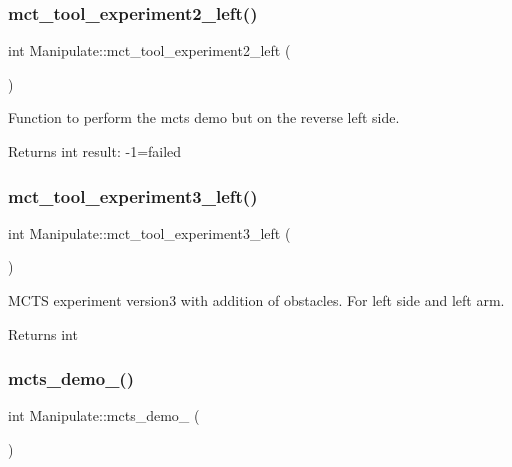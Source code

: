 \subsubsection{\texorpdfstring{mct\+\_\+tool\+\_\+experiment2\+\_\+left()}{mct\_tool\_experiment2\_left()}}
{\footnotesize\ttfamily int Manipulate\+::mct\+\_\+tool\+\_\+experiment2\+\_\+left (\begin{DoxyParamCaption}{ }\end{DoxyParamCaption})\hspace{0.3cm}{\ttfamily [private]}}



Function to perform the mcts demo but on the reverse left side. 

\begin{DoxyReturn}{Returns}
int result\+: -\/1=failed 
\end{DoxyReturn}
\mbox{\label{structManipulate_a7b8394f3cd61252c79d9c1956e7aab2e}} 
\subsubsection{\texorpdfstring{mct\+\_\+tool\+\_\+experiment3\+\_\+left()}{mct\_tool\_experiment3\_left()}}
{\footnotesize\ttfamily int Manipulate\+::mct\+\_\+tool\+\_\+experiment3\+\_\+left (\begin{DoxyParamCaption}{ }\end{DoxyParamCaption})\hspace{0.3cm}{\ttfamily [private]}}



M\+C\+TS experiment version3 with addition of obstacles. For left side and left arm. 

\begin{DoxyReturn}{Returns}
int 
\end{DoxyReturn}
\mbox{\label{structManipulate_a49b4ba7bd0c11a5abe4dcfc3f0f7af0e}} 
\subsubsection{\texorpdfstring{mcts\+\_\+demo\+\_()}{mcts\_demo\_2()}}
{\footnotesize\ttfamily int Manipulate\+::mcts\+\_\+demo\+\_ (\begin{DoxyParamCaption}{ }\end{DoxyParamCaption})\hspace{0.3cm}{\ttfamily [private]}}



